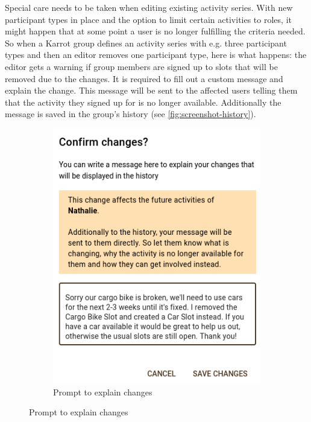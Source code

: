 \documentclass[
	a4paper,%
	11pt,%
	]{article}
\begin{document}
Special care needs to be taken when editing existing activity series. With new participant types in place and the option to limit certain activities to roles, it might happen that at some point a user is no longer fulfilling the criteria needed. So when a Karrot group defines an activity series with e.g. three participant types and then an editor removes one participant type, here is what happens: the editor gets a warning if group members are signed up to slots that will be removed due to the changes. It is required to fill out a custom message and explain the change. This message will be sent to the affected users telling them that the activity they signed up for is no longer available. Additionally the message is saved in the group's history (see \autoref{fig:screenshot-history}).

\begin{figure}[ht]
\centering
\begin{subfigure}{0.44\textwidth}
\centering
\includegraphics[width = \textwidth]{images/screenshot_activities_confirm-changes.png}
\caption{Prompt to explain changes}
\end{subfigure}

\end{figure}
\end{document}
